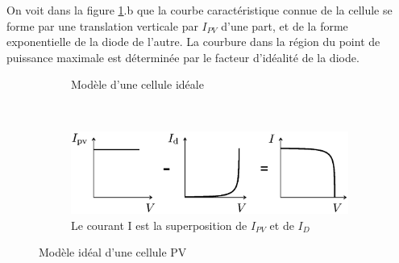 On voit dans la figure \ref{fig:idealcell}.b que la courbe caractéristique connue de la cellule se forme par une translation verticale par $I_{PV}$ d'une part, et de la forme exponentielle de la diode de l'autre. La courbure dans la région du point de puissance maximale est déterminée par le facteur d'idéalité de la diode.


\begin{figure}[t!]
  \centering
  \begin{subfigure}[b]{0.3\textwidth}
      \centering
      \shorthandoff{:!}
      \shorthandon{:!}
      \caption{Modèle d'une cellule idéale}

  \end{subfigure}
  ~
  \begin{subfigure}[b]{0.65\textwidth}
      \centering
      \includegraphics[width=\textwidth]{resources/superp.png}
      \caption{Le courant I est la superposition de $I_{PV}$ et de $I_D$ \cite{Villalva2009}}
  \end{subfigure}
  \caption{Modèle idéal d'une cellule PV}
  \label{fig:idealcell}
\end{figure}

